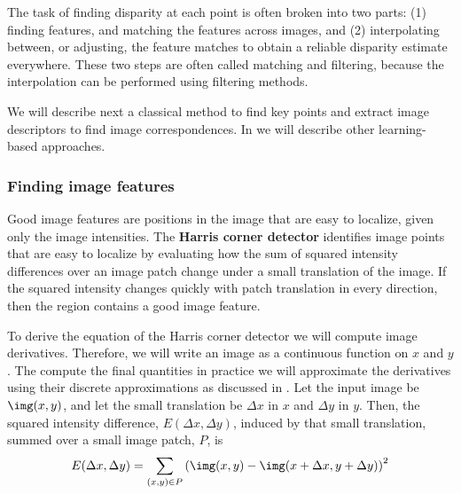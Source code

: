 The task of finding disparity at each point is often broken into two parts:  (1) finding features, and matching the features across images, and (2) interpolating between, or adjusting, the feature matches to obtain a reliable disparity estimate everywhere.
These two steps are often called matching and filtering, because the interpolation can be performed using filtering methods.

We will describe next a classical method to find key points and extract image descriptors to find image correspondences. In \chap{\ref{chapter:3D_multiview}} we will describe other learning-based approaches.

\subsubsection{Finding image features}
\label{sec:finding_image_features}

Good image features are positions in the image that are easy to localize, given only the image intensities. The {\bf Harris corner detector} \cite{Harris88}
identifies image points that are easy to localize by evaluating how the sum of squared intensity differences over an image patch change under a small translation of the image. If the squared intensity changes quickly with patch translation in every direction, then the region contains a good image feature.

To derive the equation of the Harris corner detector we will compute image derivatives. Therefore, we will write an image as a continuous function on $x$ and $y$. The compute the final quantities in practice we will approximate the derivatives using their discrete approximations as discussed in \chap{\ref{chapter:image_derivatives}}. Let the input image be $\img (x,y)$, and let the small translation be $\Delta x$ in $x$ and $\Delta y$ in $y$.  Then, the squared intensity difference, $E(\Delta x, \Delta y)$, induced by that small translation, summed over a small image patch, $P$, is
\begin{equation}
    E(\Delta x, \Delta y) = \sum_{(x, y) \in P}
    \left(
    \img(x,y) - \img(x + \Delta x, y + \Delta y)
    \right)^2
    \label{eq:harris}
\end{equation}

